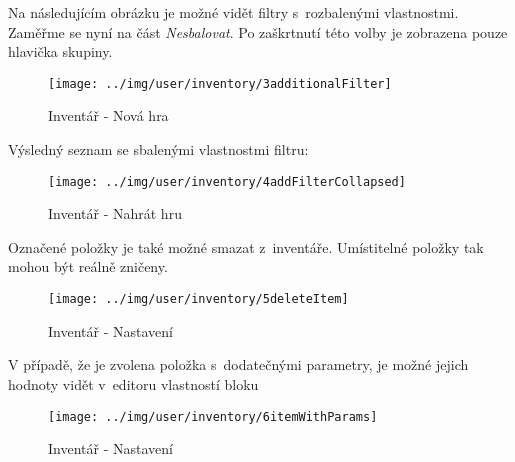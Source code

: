 \FloatBarrier

Na následujícím obrázku je možné vidět filtry s~rozbalenými vlastnostmi. Zaměřme se nyní na část \textit{Nesbalovat}. Po zaškrtnutí této volby je zobrazena pouze hlavička skupiny.

\begin{figure}[!ht]\centering
\texttt{[image: ../img/user/inventory/3additionalFilter]}

\caption{Inventář - Nová hra}
\label{fig:user_inventory_3additionalFilter}

\end{figure}

\FloatBarrier

Výsledný seznam se sbalenými vlastnostmi filtru:

\begin{figure}[!ht]\centering
\texttt{[image: ../img/user/inventory/4addFilterCollapsed]}

\caption{Inventář - Nahrát hru}
\label{fig:user_inventory_4addFilterCollapsed}

\end{figure}

\FloatBarrier

Označené položky je také možné smazat z~inventáře. Umístitelné položky tak mohou být reálně zničeny. 

\begin{figure}[!ht]\centering
\texttt{[image: ../img/user/inventory/5deleteItem]}

\caption{Inventář - Nastavení}
\label{fig:user_inventory_5deleteItem}

\end{figure}

\FloatBarrier
V případě, že je zvolena položka s~dodatečnými parametry, je možné jejich hodnoty vidět v~editoru vlastností bloku

\begin{figure}[!ht]\centering
\texttt{[image: ../img/user/inventory/6itemWithParams]}

\caption{Inventář - Nastavení}
\label{fig:user_inventory_6itemWithParams}

\end{figure}


\FloatBarrier